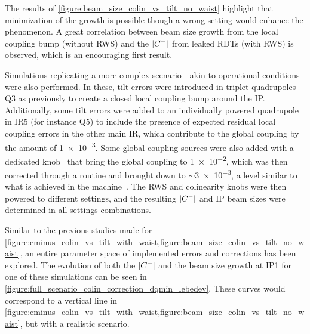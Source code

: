 The results of \cref{figure:beam_size_colin_vs_tilt_no_waist} highlight that minimization of the growth is possible though a wrong setting would enhance the phenomenon.
A great correlation between beam size growth from the local coupling bump (without RWS) and the \(\left\lvert C^{-} \right\rvert\) from leaked RDTs (with RWS) is observed, which is an encouraging first result.
\newline

Simulations replicating a more complex scenario - akin to operational conditions - were also performed.
In these, tilt errors were introduced in triplet quadrupoles Q\num{3} as previously to create a closed local coupling bump around the IP.
Additionally, some tilt errors were added to an individually powered quadrupole in IR\num{5} (for instance Q\num{5}) to include the presence of expected residual local coupling errors in the other main IR, which contribute to the global coupling by the amount of \num{1e-3}.
Some global coupling sources were also added with a dedicated knob~\cite{CERN:Tomas:Optimizing_Global_Coupling_Knobs_LHC} that bring the global coupling to \num{1e-2}, which was then corrected through a routine and brought down to \(\sim\)\num{3e-3}, a level similar to what is achieved in the machine~\cite{PRES:Persson:Transverse_Coupling_OMC_OP,PRES:Persson:Transverse_Coupling_Stability_HLLHC_WP2}.
The RWS and colinearity knobs were then powered to different settings, and the resulting \(\left\lvert C^{-} \right\rvert\) and IP beam sizes were determined in all settings combinations.

Similar to the previous studies made for \cref{figure:cminus_colin_vs_tilt_with_waist,figure:beam_size_colin_vs_tilt_no_waist}, an entire parameter space of implemented errors and corrections has been explored.
The evolution of both the \(\left\lvert C^{-} \right\rvert\) and the beam size growth at IP\num{1} for one of these simulations can be seen in \cref{figure:full_scenario_colin_correction_dqmin_lebedev}.
These curves would correspond to a vertical line in \cref{figure:cminus_colin_vs_tilt_with_waist,figure:beam_size_colin_vs_tilt_no_waist}, but with a realistic scenario.

